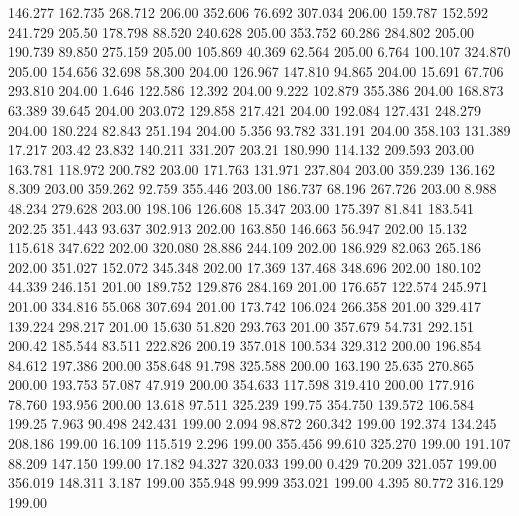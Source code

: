  146.277  162.735  268.712       206.00
 352.606   76.692  307.034       206.00
 159.787  152.592  241.729       205.50
 178.798   88.520  240.628       205.00
 353.752   60.286  284.802       205.00
 190.739   89.850  275.159       205.00
 105.869   40.369   62.564       205.00
   6.764  100.107  324.870       205.00
 154.656   32.698   58.300       204.00
 126.967  147.810   94.865       204.00
  15.691   67.706  293.810       204.00
   1.646  122.586   12.392       204.00
   9.222  102.879  355.386       204.00
 168.873   63.389   39.645       204.00
 203.072  129.858  217.421       204.00
 192.084  127.431  248.279       204.00
 180.224   82.843  251.194       204.00
   5.356   93.782  331.191       204.00
 358.103  131.389   17.217       203.42
  23.832  140.211  331.207       203.21
 180.990  114.132  209.593       203.00
 163.781  118.972  200.782       203.00
 171.763  131.971  237.804       203.00
 359.239  136.162    8.309       203.00
 359.262   92.759  355.446       203.00
 186.737   68.196  267.726       203.00
   8.988   48.234  279.628       203.00
 198.106  126.608   15.347       203.00
 175.397   81.841  183.541       202.25
 351.443   93.637  302.913       202.00
 163.850  146.663   56.947       202.00
  15.132  115.618  347.622       202.00
 320.080   28.886  244.109       202.00
 186.929   82.063  265.186       202.00
 351.027  152.072  345.348       202.00
  17.369  137.468  348.696       202.00
 180.102   44.339  246.151       201.00
 189.752  129.876  284.169       201.00
 176.657  122.574  245.971       201.00
 334.816   55.068  307.694       201.00
 173.742  106.024  266.358       201.00
 329.417  139.224  298.217       201.00
  15.630   51.820  293.763       201.00
 357.679   54.731  292.151       200.42
 185.544   83.511  222.826       200.19
 357.018  100.534  329.312       200.00
 196.854   84.612  197.386       200.00
 358.648   91.798  325.588       200.00
 163.190   25.635  270.865       200.00
 193.753   57.087   47.919       200.00
 354.633  117.598  319.410       200.00
 177.916   78.760  193.956       200.00
  13.618   97.511  325.239       199.75
 354.750  139.572  106.584       199.25
   7.963   90.498  242.431       199.00
   2.094   98.872  260.342       199.00
 192.374  134.245  208.186       199.00
  16.109  115.519    2.296       199.00
 355.456   99.610  325.270       199.00
 191.107   88.209  147.150       199.00
  17.182   94.327  320.033       199.00
   0.429   70.209  321.057       199.00
 356.019  148.311    3.187       199.00
 355.948   99.999  353.021       199.00
   4.395   80.772  316.129       199.00
